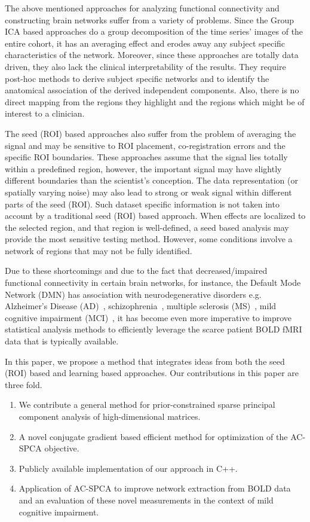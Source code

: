 \documentclass{article}
\begin{document}
The above mentioned approaches for analyzing functional connectivity and constructing brain networks suffer from a variety of problems. Since the Group ICA based approaches do a group decomposition of the time series' images of the entire cohort, it has an averaging effect and erodes away any subject specific characteristics of the network. Moreover, since these approaches are totally data driven, they also lack the clinical interpretability of the results. They require post-hoc methods to derive subject specific networks and to identify the anatomical association of the derived independent components. Also, there is no direct mapping from the regions they highlight and the regions which might be of interest to a clinician. 


The seed (ROI) based approaches also suffer from the problem of averaging the signal and may be sensitive to ROI placement, co-registration errors and the specific ROI boundaries. These approaches assume that the signal lies totally within a predefined region, however, the important signal may have slightly different boundaries than the scientist's conception.  The data representation (or spatially varying noise) may
also lead to strong or weak signal within different parts of the seed (ROI).
Such dataset specific information is not taken into account by a
traditional seed (ROI) based approach.  When effects are localized to the selected region, and that region is well-defined, a seed based analysis may
provide the most sensitive testing method.  However, some conditions
involve a network of regions that may not be fully identified.

Due to these shortcomings and due to the fact that decreased/impaired functional connectivity in certain brain networks, for instance, the Default Mode Network (DMN) has association with neurodegenerative disorders e.g. Alzheimer's Disease (AD)~\citep{greicius2004default}, schizophrenia~\citep{liu2008disrupted,whitfield2009hyperactivity}, multiple sclerosis (MS)~\citep{lowe2008resting}, mild cognitive impairment (MCI)~\citep{petrella2011default}, it has become even more imperative to improve statistical analysis methods to efficiently leverage the scarce patient BOLD fMRI data that is typically available. 

In this paper, we propose a method that integrates ideas from both the seed (ROI) based and learning based approaches. Our contributions in this paper are three fold.

\begin{enumerate}
\item We contribute a general method for prior-constrained sparse principal component analysis of high-dimensional matrices.
\item A novel conjugate gradient based efficient method for optimization of the AC-SPCA objective. 
\item Publicly available implementation of our approach in C++.
\item Application of AC-SPCA to improve network extraction from BOLD data and an evaluation of these novel measurements in the context of mild cognitive impairment.  
\end{enumerate}
\end{document}
